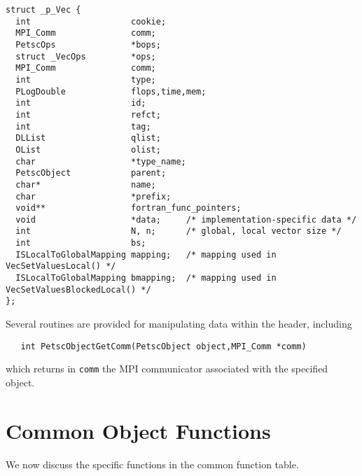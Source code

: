 \begin{verbatim}
struct _p_Vec {
  int                    cookie;                                  
  MPI_Comm               comm;                                    
  PetscOps               *bops;                                   
  struct _VecOps         *ops;                                    
  MPI_Comm               comm;
  int                    type;                                    
  PLogDouble             flops,time,mem;                          
  int                    id;                                      
  int                    refct;                                   
  int                    tag;                                     
  DLList                 qlist;                                   
  OList                  olist;                                   
  char                   *type_name;                              
  PetscObject            parent;                                  
  char*                  name;                                    
  char                   *prefix;                                 
  void**                 fortran_func_pointers;       
  void                   *data;     /* implementation-specific data */
  int                    N, n;      /* global, local vector size */
  int                    bs;
  ISLocalToGlobalMapping mapping;   /* mapping used in VecSetValuesLocal() */
  ISLocalToGlobalMapping bmapping;  /* mapping used in VecSetValuesBlockedLocal() */
};
\end{verbatim}

Several routines are provided for manipulating data within the header,
including
\begin{verbatim}
   int PetscObjectGetComm(PetscObject object,MPI_Comm *comm) 
\end{verbatim}
which returns in {\tt comm}  the MPI communicator associated with the
specified object.

\section{Common Object Functions}

We now discuss the specific functions in the common function table.

